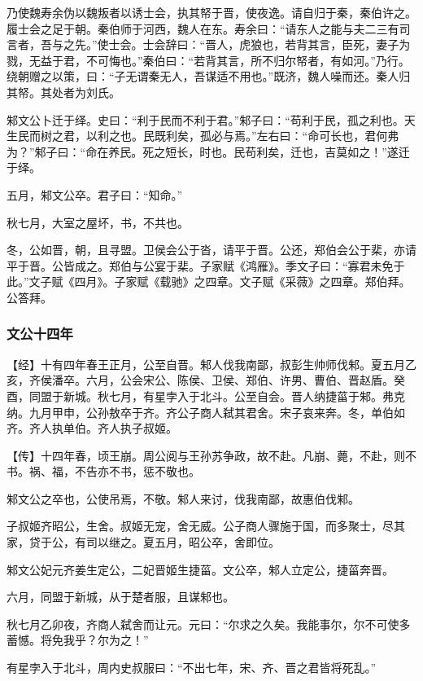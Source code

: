 \documentclass[]{article}
\begin{document}
乃使魏寿余伪以魏叛者以诱士会，执其帑于晋，使夜逸。请自归于秦，秦伯许之。履士会之足于朝。秦伯师于河西，魏人在东。寿余曰：``请东人之能与夫二三有司言者，吾与之先。''使士会。士会辞曰：``晋人，虎狼也，若背其言，臣死，妻子为戮，无益于君，不可悔也。''秦伯曰：``若背其言，所不归尔帑者，有如河。''乃行。绕朝赠之以策，曰：``子无谓秦无人，吾谋适不用也。''既济，魏人噪而还。秦人归其帑。其处者为刘氏。

邾文公卜迁于绎。史曰：``利于民而不利于君。''邾子曰：``苟利于民，孤之利也。天生民而树之君，以利之也。民既利矣，孤必与焉。''左右曰：``命可长也，君何弗为？''邾子曰：``命在养民。死之短长，时也。民苟利矣，迁也，吉莫如之！''遂迁于绎。

五月，邾文公卒。君子曰：``知命。''

秋七月，大室之屋坏，书，不共也。

冬，公如晋，朝，且寻盟。卫侯会公于沓，请平于晋。公还，郑伯会公于棐，亦请平于晋。公皆成之。郑伯与公宴于棐。子家赋《鸿雁》。季文子曰：``寡君未免于此。''文子赋《四月》。子家赋《载驰》之四章。文子赋《采薇》之四章。郑伯拜。公答拜。

\hypertarget{header-n1209}{%
\subsubsection{文公十四年}\label{header-n1209}}

【经】十有四年春王正月，公至自晋。邾人伐我南鄙，叔彭生帅师伐邾。夏五月乙亥，齐侯潘卒。六月，公会宋公、陈侯、卫侯、郑伯、许男、曹伯、晋赵盾。癸酉，同盟于新城。秋七月，有星孛入于北斗。公至自会。晋人纳捷菑于邾。弗克纳。九月甲申，公孙敖卒于齐。齐公子商人弑其君舍。宋子哀来奔。冬，单伯如齐。齐人执单伯。齐人执子叔姬。

【传】十四年春，顷王崩。周公阅与王孙苏争政，故不赴。凡崩、薨，不赴，则不书。祸、福，不告亦不书，惩不敬也。

邾文公之卒也，公使吊焉，不敬。邾人来讨，伐我南鄙，故惠伯伐邾。

子叔姬齐昭公，生舍。叔姬无宠，舍无威。公子商人骤施于国，而多聚士，尽其家，贷于公，有司以继之。夏五月，昭公卒，舍即位。

邾文公妃元齐姜生定公，二妃晋姬生捷菑。文公卒，邾人立定公，捷菑奔晋。

六月，同盟于新城，从于楚者服，且谋邾也。

秋七月乙卯夜，齐商人弑舍而让元。元曰：``尔求之久矣。我能事尔，尔不可使多蓄憾。将免我乎？尔为之！''

有星孛入于北斗，周内史叔服曰：``不出七年，宋、齐、晋之君皆将死乱。''
\end{document}

